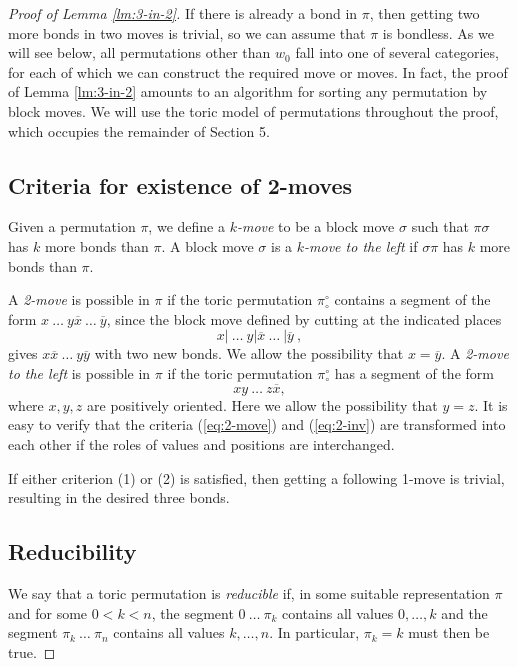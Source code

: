 \documentclass[11pt]{amsart} %
\newcommand{\Bpi}{{\pi}^\circ}
\newcommand{\Tpi}{\Bpi_\circ}
\newcommand{\xbar}{\overline{x}}
\newcommand{\ybar}{\overline{y}}
\begin{document}
\begin{proof}[Proof of Lemma \ref{lm:3-in-2}]
If there is already a bond in $\pi$, then getting two more bonds in two
moves is trivial, so we can assume that $\pi$ is bondless.
As we will see below, all permutations other than $w_0$ 
fall into one of several categories, for each of which we can construct the
required move or moves. In fact, the proof of Lemma \ref{lm:3-in-2}
amounts to an algorithm for sorting any permutation by block moves. 
We will use the toric model of permutations throughout the proof,
which occupies the remainder of Section 5.

\subsection{Criteria for existence of 2-moves}
Given a permutation $\pi$, we define a  {\em $k$-move} to be a
block move $\sigma$ such that $\pi\sigma$ has $k$ more bonds than $\pi$.
A block move $\sigma$ is a {\em $k$-move to the left} if 
$\sigma\pi$ has $k$ more bonds than $\pi$.

A {\em 2-move} is possible in $\pi$ if the toric permutation $\Tpi$ contains a
segment of the form
$   x\ \dots\ y \xbar\ \dots\ \ybar$,  
since the block move defined by cutting at the indicated places
\begin{equation}\label{eq:2-move}
   x|\ \dots\ y| \xbar\ \dots\ |\ybar \ ,
\end{equation}
gives $x\xbar\ \dots\ y\ybar$ with two new bonds. We allow the
possibility that $x=\ybar$. A {\em 2-move to the left} is possible in $\pi$ if
the toric permutation $\Tpi$ has a segment of the form
\begin{equation}\label{eq:2-inv}
   xy\ \dots\ z\xbar, %
\end{equation}
where $x,y,z$ are positively oriented. Here we allow the
possibility that $y=z$. It is easy to verify that the criteria
(\ref{eq:2-move}) and (\ref{eq:2-inv}) are transformed into each
other if the roles of values and positions are interchanged.

If either criterion (1) or (2) is satisfied, 
then getting a following 1-move is 
trivial, resulting in the desired three bonds.

\subsection{Reducibility}
We say that a toric permutation is {\em reducible} if, in some
suitable representation $\pi$ and for some $0<k<n$, the segment $
0\ \dots\ \pi_k $ contains all values $0,\dots, k$ and the segment
$ \pi_k\ \dots\ \pi_n $ contains all values $k,\dots, n$. In
particular, $\pi_k=k$ must then be true.


\end{proof}
\end{document}
